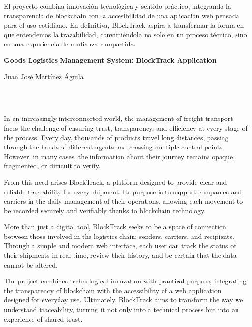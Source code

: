 El proyecto combina innovación tecnológica y sentido práctico, integrando la transparencia de blockchain 
con la accesibilidad de una aplicación web pensada para el uso cotidiano. En definitiva, 
BlockTrack aspira a transformar la forma en que entendemos la trazabilidad, 
convirtiéndola no solo en un proceso técnico, sino en una experiencia de confianza compartida.\
\cleardoublepage


\thispagestyle{empty}


\begin{center}
{\large\bfseries Goods Logistics Management System: BlockTrack Application}\
\end{center}
\begin{center}
Juan José Martínez Águila\\
\end{center}

\

\vspace{0.7cm}
\\

In an increasingly interconnected world, the management of freight transport faces the challenge of ensuring trust, transparency, and efficiency at every stage of the process. Every day, thousands of products travel long distances, passing through the hands of different agents and crossing multiple control points. However, in many cases, the information about their journey remains opaque, fragmented, or difficult to verify.\

From this need arises BlockTrack, a platform designed to provide clear and reliable traceability for every shipment. Its purpose is to support companies and carriers in the daily management of their operations, allowing each movement to be recorded securely and verifiably thanks to blockchain technology.\

More than just a digital tool, BlockTrack seeks to be a space of connection between those involved in the logistics chain: senders, carriers, and recipients. Through a simple and modern web interface, each user can track the status of their shipments in real time, review their history, and be certain that the data cannot be altered.\

The project combines technological innovation with practical purpose, integrating the transparency of blockchain with the accessibility of a web application designed for everyday use. Ultimately, BlockTrack aims to transform the way we understand traceability, turning it not only into a technical process but into an experience of shared trust.\

